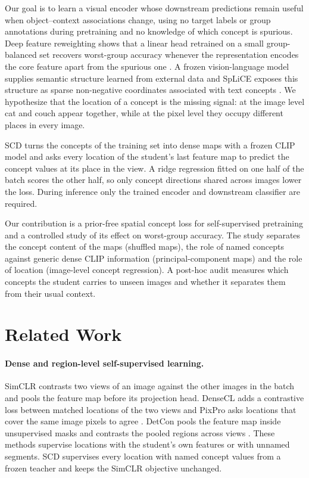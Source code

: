 \documentclass{article}
\begin{document}
Our goal is to learn a visual encoder whose downstream predictions remain useful when object--context associations change, using no target labels or group annotations during pretraining and no knowledge of which concept is spurious. Deep feature reweighting shows that a linear head retrained on a small group-balanced set recovers worst-group accuracy whenever the representation encodes the core feature apart from the spurious one \citep{kirichenko2023dfr}. A frozen vision-language model supplies semantic structure learned from external data and SpLiCE exposes this structure as sparse non-negative coordinates associated with text concepts \citep{bhalla2024splice}. We hypothesize that the location of a concept is the missing signal: at the image level cat and couch appear together, while at the pixel level they occupy different places in every image.

SCD turns the concepts of the training set into dense maps with a frozen CLIP model and asks every location of the student's last feature map to predict the concept values at its place in the view. A ridge regression fitted on one half of the batch scores the other half, so only concept directions shared across images lower the loss. During inference only the trained encoder and downstream classifier are required.

Our contribution is a prior-free spatial concept loss for self-supervised pretraining and a controlled study of its effect on worst-group accuracy. The study separates the concept content of the maps (shuffled maps), the role of named concepts against generic dense CLIP information (principal-component maps) and the role of location (image-level concept regression). A post-hoc audit measures which concepts the student carries to unseen images and whether it separates them from their usual context.

\section{Related Work}
\paragraph{Dense and region-level self-supervised learning.}
SimCLR contrasts two views of an image against the other images in the batch \citep{chen2020simclr} and pools the feature map before its projection head. DenseCL adds a contrastive loss between matched locations of the two views \citep{wang2021densecl} and PixPro asks locations that cover the same image pixels to agree \citep{xie2021pixpro}. DetCon pools the feature map inside unsupervised masks and contrasts the pooled regions across views \citep{henaff2021detcon}. These methods supervise locations with the student's own features or with unnamed segments. SCD supervises every location with named concept values from a frozen teacher and keeps the SimCLR objective unchanged.
\end{document}
